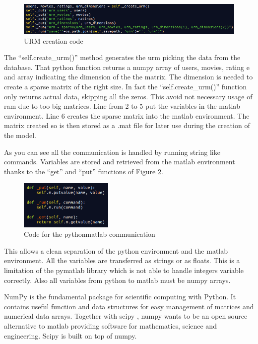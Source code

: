 \begin{figure}
  \centering
  \includegraphics[width=\textwidth]{figures/urm_creation_code.png}
  \caption{URM creation code}
  \label{fig:urm_creation_code}
\end{figure}

The ``self.create\_urm()'' method generates the urm picking the data from the database. That python function returns a numpy array of users, movies, rating e and array indicating the dimension of the the matrix. The dimension is needed to create a sparse matrix of the right size. In fact the ``self.create\_urm()'' function only returns actual data, skipping all the zeros. This avoid not necessary usage of ram due to too big matrices. Line from 2 to 5 put the variables in the matlab environment. Line 6 creates the sparse matrix into the matlab environment. The matrix created so is then stored as a .mat file for later use during the creation of the model.

As you can see all the communication is handled by running string like commands. Variables are stored and retrieved from the matlab environment thanks to the ``get'' and ``put'' functions of Figure \ref{fig:matlab_put_get_code}.

\begin{figure}
  \centering
  \includegraphics[width=0.4\textwidth]{figures/matlab_put_get_code.png}
  \caption{Code for the python\-matlab communication}
  \label{fig:matlab_put_get_code}
\end{figure}

This allows a clean separation of the python environment and the matlab environment. All the variables are transferred as strings or as floats. This is a limitation of the pymatlab library which is not able to handle integers variable correctly. Also all variables from python to matlab must be numpy \cite{numpy} arrays.

NumPy is the fundamental package for scientific computing with Python. It contains useful function and data structures for easy management of matrices and numerical data arrays. Together with scipy \cite{scipy}, numpy wants to be an open source alternative to matlab providing software for mathematics, science and engineering. Scipy is built on top of numpy.

